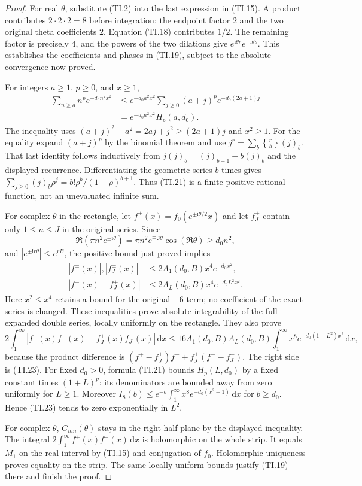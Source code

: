 \documentclass[11pt]{article}
\newcommand{\ii}{\mathrm i}
\newcommand{\dd}{\,\mathrm d}
\begin{document}
\begin{proof}
For real $\theta$, substitute (TI.2) into the last expression in
(TI.15). A product contributes $2\cdot2\cdot2=8$ before integration:
the endpoint factor $2$ and the two original theta coefficients $2$.
Equation (TI.18) contributes $1/2$. The remaining factor is precisely
$4$, and the powers of the two dilations give
$e^{\ii\theta r}e^{-\ii\theta s}$. This establishes the coefficients
and phases in (TI.19), subject to the absolute convergence now proved.

For integers $a\ge1$, $p\ge0$, and $x\ge1$,
\begin{align*}
 \sum_{n\ge a}n^p e^{-d_0n^2x^2}
 &\le e^{-d_0a^2x^2}\sum_{j\ge0}(a+j)^p
          e^{-d_0(2a+1)j}\\
 &=e^{-d_0a^2x^2}H_p(a,d_0).
\end{align*}
The inequality uses $(a+j)^2-a^2=2aj+j^2\ge(2a+1)j$ and $x^2\ge1$.
For the equality expand $(a+j)^p$ by the binomial theorem and use
$j^r=\sum_b\genfrac{\{}{\}}{0pt}{}{r}{b}(j)_b$. That last identity follows inductively
from $j(j)_b=(j)_{b+1}+b(j)_b$ and the displayed recurrence.
Differentiating the geometric series $b$ times gives
$\sum_{j\ge0}(j)_b\rho^j=b!\rho^b/(1-\rho)^{b+1}$.
Thus (TI.21) is a finite positive rational function, not an unevaluated
infinite sum.

For complex $\theta$ in the rectangle, let
$f^\pm(x)=f_0(e^{\pm\ii\theta/2}x)$ and let $f_J^\pm$ contain only
$1\le n\le J$ in the original series. Since
\[
 \Re(\pi n^2e^{\pm\ii\theta})
 =\pi n^2e^{\mp\Im\theta}\cos(\Re\theta)\ge d_0n^2,
\]
and $|e^{\pm\ii r\theta}|\le e^{rB}$, the positive bound just proved
implies
\begin{align*}
 |f^\pm(x)|, |f_J^\pm(x)|
 &\le2A_1(d_0,B)x^4e^{-d_0x^2},\\
 |f^\pm(x)-f_J^\pm(x)|
 &\le2A_L(d_0,B)x^4e^{-d_0L^2x^2}.
\end{align*}
Here $x^2\le x^4$ retains a bound for the original $-6$ term;
no coefficient of the exact series is changed. These inequalities
prove absolute integrability of the full expanded double series,
locally uniformly on the rectangle. They also prove
\[
 2\int_1^\infty
 |f^+(x)f^-(x)-f_J^+(x)f_J^-(x)|\dd x
 \le16A_1(d_0,B)A_L(d_0,B)
 \int_1^\infty x^8e^{-d_0(1+L^2)x^2}\dd x,
\]
because the product difference is
$(f^+-f_J^+)f^-+f_J^+(f^--f_J^-)$.
The right side is (TI.23). For fixed $d_0>0$, formula (TI.21) bounds
$H_p(L,d_0)$ by a fixed constant times $(1+L)^p$: its denominators
are bounded away from zero uniformly for $L\ge1$. Moreover
$I_8(b)\le e^{-b}\int_1^\infty x^8e^{-d_0(x^2-1)}\dd x$ for
$b\ge d_0$. Hence (TI.23) tends to zero exponentially in $L^2$.

For complex $\theta$, $C_{mn}(\theta)$ stays in the right half-plane
by the displayed inequality. The integral
$2\int_1^\infty f^+(x)f^-(x)\dd x$ is holomorphic on the whole strip.
It equals $M_1$ on the real interval by (TI.15) and conjugation of
$f_0$. Holomorphic uniqueness proves equality on the strip. The same
locally uniform bounds justify (TI.19) there and finish the proof.
\end{proof}
\end{document}

